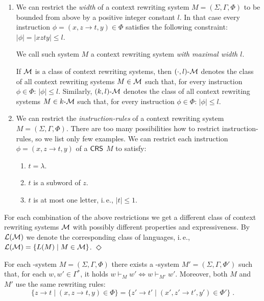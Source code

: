 \begin{definition}
\begin{enumerate}
\item\label{restriction:width}
We can restrict the \emph{width} of a context rewriting system $M=(\Sigma, \Gamma, \Phi)$ to be bounded from above by a positive integer constant $l$. In that case every instruction $\phi = (x, z \to t, y) \in \Phi$ satisfies the following constraint: $|\phi| = |xzty| \le l$.

We call such system $M$ a context rewriting system \emph{with maximal width $l$}.

If $\textup{\sf $\mathcal{M}$}$ is a class of context rewriting systems, then $\textup{\sf $(\cdot,l)$-\textup{\sf $\mathcal{M}$}}$ denotes the class of all context rewriting systems $M \in \textup{\sf $\mathcal{M}$}$ such that, for every instruction $\phi \in \Phi$: $|\phi| \le l$. Similarly, $\textup{\sf $(k,l)$-\textup{\sf $\mathcal{M}$}}$ denotes the class of all context rewriting systems $M \in \textup{\sf $k$-\textup{\sf $\mathcal{M}$}}$ such that, for every instruction $\phi \in \Phi$: $|\phi| \le l$.

\item\label{restriction:rules}
We can restrict the \emph{instruction-rules} of a context rewriting system $M=(\Sigma, \Gamma, \Phi)$. There are too many possibilities how to restrict instruction-rules, so we list only few examples. We can restrict each instruction $\phi = (x, z \to t, y)$ of a
$\mbox{\sf CRS\/}$ $M$ to satisfy:
\begin{enumerate}
\item $t = \lambda$.
\item $t$ is a subword of $z$.
\item $t$ is at most one letter, i.\,e., $|t| \le 1$.
\end{enumerate}
\end{enumerate}
For each combination of the above restrictions we get a different class of context rewriting systems $\textup{\sf $\mathcal{M}$}$ with possibly different properties and expressiveness. By ${\cal L}(\textup{\sf $\mathcal{M}$})$ we denote the corresponding class of languages, i.\,e., ${\cal L}(\textup{\sf $\mathcal{M}$}) = \{L(M) \mid M \in \textup{\sf $\mathcal{M}$}\}$. 
\hfill$\Diamond$
\end{definition}

\begin{theorem}\label{theorem:context_extension}
For each \kCRS[k]-system $M=(\Sigma, \Gamma, \Phi)$ there exists a \kCRS[(k+1)]-system $M'=(\Sigma, \Gamma, \Phi')$ such that, for each $w, w' \in \Gamma^*$, it holds $w \vdash_M w' \Leftrightarrow w \vdash_{M'} w'$. Moreover, both $M$ and $M'$ use the same rewriting rules:
$$\{ z \to t \mid (x, z \to t, y) \in \Phi \} = \{ z' \to t' \mid (x', z' \to t', y') \in \Phi' \}\;.$$
\end{theorem}

